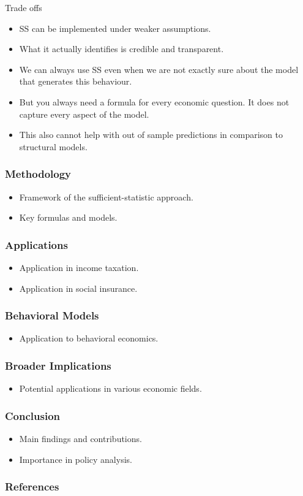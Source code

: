 \documentclass{beamer}
\begin{document}
\begin{frame}{Trade offs}
\begin{itemize}
    \item SS can be implemented under weaker assumptions. 
    \item What it actually identifies is credible and transparent. 
    \item We can always use SS even when we are not exactly sure about the model that generates this behaviour. 
    \item But you always need a formula for every economic question. It does not capture every aspect of the model. 
    \item This also cannot help with out of sample predictions in comparison to structural models.
\end{itemize}    
\end{frame}

\begin{frame}
\frametitle{Methodology}
\begin{itemize}
    \item Framework of the sufficient-statistic approach.
    \item Key formulas and models.
\end{itemize}
\end{frame}

\begin{frame}
\frametitle{Applications}
\begin{itemize}
    \item Application in income taxation.
    \item Application in social insurance.
\end{itemize}
\end{frame}

\begin{frame}
\frametitle{Behavioral Models}
\begin{itemize}
    \item Application to behavioral economics.
\end{itemize}
\end{frame}

\begin{frame}
\frametitle{Broader Implications}
\begin{itemize}
    \item Potential applications in various economic fields.
\end{itemize}
\end{frame}

\begin{frame}
\frametitle{Conclusion}
\begin{itemize}
    \item Main findings and contributions.
    \item Importance in policy analysis.
\end{itemize}
\end{frame}

\begin{frame}
\frametitle{References}
\end{frame}
\end{document}
